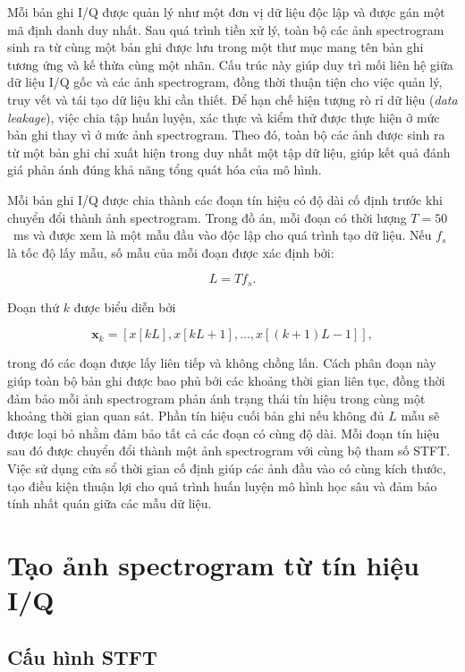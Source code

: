 \documentclass[../DoAn.tex]{subfiles}
\begin{document}
Mỗi bản ghi I/Q được quản lý như một đơn vị dữ liệu độc lập và được gán một mã định danh duy nhất. Sau quá trình tiền xử lý, toàn bộ các ảnh spectrogram sinh ra từ cùng một bản ghi được lưu trong một thư mục mang tên bản ghi tương ứng và kế thừa cùng một nhãn. Cấu trúc này giúp duy trì mối liên hệ giữa dữ liệu I/Q gốc và các ảnh spectrogram, đồng thời thuận tiện cho việc quản lý, truy vết và tái tạo dữ liệu khi cần thiết. Để hạn chế hiện tượng rò rỉ dữ liệu (\textit{data leakage}), việc chia tập huấn luyện, xác thực và kiểm thử được thực hiện ở mức bản ghi thay vì ở mức ảnh spectrogram. Theo đó, toàn bộ các ảnh được sinh ra từ một bản ghi chỉ xuất hiện trong duy nhất một tập dữ liệu, giúp kết quả đánh giá phản ánh đúng khả năng tổng quát hóa của mô hình. 

Mỗi bản ghi I/Q được chia thành các đoạn tín hiệu có độ dài cố định trước khi chuyển đổi thành ảnh spectrogram. Trong đồ án, mỗi đoạn có thời lượng $T=50$~ms và được xem là một mẫu đầu vào độc lập cho quá trình tạo dữ liệu. Nếu $f_s$ là tốc độ lấy mẫu, số mẫu của mỗi đoạn được xác định bởi:

\begin{equation}
L=T f_s.
\end{equation}

Đoạn thứ $k$ được biểu diễn bởi

\begin{equation}
\mathbf{x}_k=
\left[
x[kL],x[kL+1],\ldots,x[(k+1)L-1]
\right],
\end{equation}

trong đó các đoạn được lấy liên tiếp và không chồng lấn. Cách phân đoạn này giúp toàn bộ bản ghi được bao phủ bởi các khoảng thời gian liên tục, đồng thời đảm bảo mỗi ảnh spectrogram phản ánh trạng thái tín hiệu trong cùng một khoảng thời gian quan sát. Phần tín hiệu cuối bản ghi nếu không đủ $L$ mẫu sẽ được loại bỏ nhằm đảm bảo tất cả các đoạn có cùng độ dài. Mỗi đoạn tín hiệu sau đó được chuyển đổi thành một ảnh spectrogram với cùng bộ tham số STFT. Việc sử dụng cửa sổ thời gian cố định giúp các ảnh đầu vào có cùng kích thước, tạo điều kiện thuận lợi cho quá trình huấn luyện mô hình học sâu và đảm bảo tính nhất quán giữa các mẫu dữ liệu.

\section{Tạo ảnh spectrogram từ tín hiệu I/Q}

\subsection{Cấu hình STFT}
\end{document}
